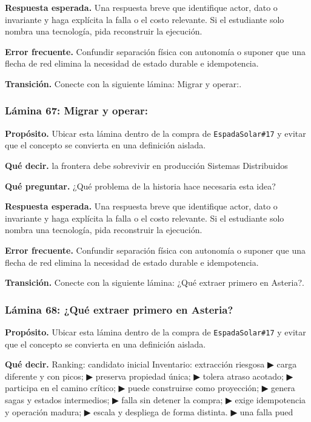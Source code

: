 \documentclass[variant=docente,cover=institutional,mode=screen]{ua-engineering-v6-article}
\begin{document}
\textbf{Respuesta esperada.} Una respuesta breve que identifique actor, dato o invariante y haga explícita la falla o el costo relevante. Si el estudiante solo nombra una tecnología, pida reconstruir la ejecución.

\textbf{Error frecuente.} Confundir separación física con autonomía o suponer que una flecha de red elimina la necesidad de estado durable e idempotencia.

\textbf{Transición.} Conecte con la siguiente lámina: Migrar y operar:.

\subsubsection*{Lámina 67: Migrar y operar:}
\textbf{Propósito.} Ubicar esta lámina dentro de la compra de \texttt{EspadaSolar\#17} y evitar que el concepto se convierta en una definición aislada.

\textbf{Qué decir.} la frontera debe sobrevivir en producción Sistemas Distribuidos

\textbf{Qué preguntar.} ¿Qué problema de la historia hace necesaria esta idea?

\textbf{Respuesta esperada.} Una respuesta breve que identifique actor, dato o invariante y haga explícita la falla o el costo relevante. Si el estudiante solo nombra una tecnología, pida reconstruir la ejecución.

\textbf{Error frecuente.} Confundir separación física con autonomía o suponer que una flecha de red elimina la necesidad de estado durable e idempotencia.

\textbf{Transición.} Conecte con la siguiente lámina: ¿Qué extraer primero en Asteria?.

\subsubsection*{Lámina 68: ¿Qué extraer primero en Asteria?}
\textbf{Propósito.} Ubicar esta lámina dentro de la compra de \texttt{EspadaSolar\#17} y evitar que el concepto se convierta en una definición aislada.

\textbf{Qué decir.} Ranking: candidato inicial Inventario: extracción riesgosa ▶ carga diferente y con picos; ▶ preserva propiedad única; ▶ tolera atraso acotado; ▶ participa en el camino crítico; ▶ puede construirse como proyección; ▶ genera sagas y estados intermedios; ▶ falla sin detener la compra; ▶ exige idempotencia y operación madura; ▶ escala y despliega de forma distinta. ▶ una falla pued
\end{document}
